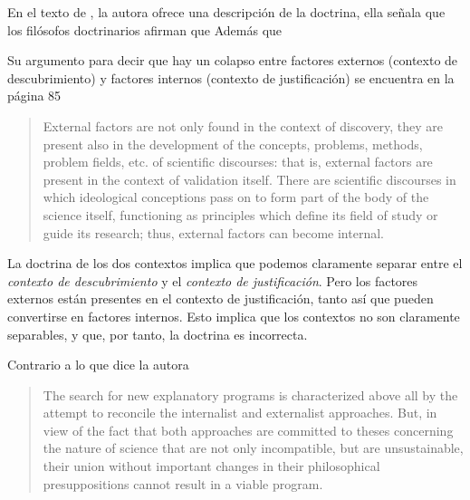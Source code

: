 \noindent En el texto de \textcite[][p.75]{Yturbe1995}, la autora ofrece una descripción de la doctrina, ella señala que los filósofos doctrinarios afirman que 
Además que 


Su argumento para decir que hay un colapso entre factores externos (contexto de descubrimiento) y factores internos (contexto de justificación) se encuentra en la página 85

\begin{quote}

	External factors are not only found in the context of discovery, they are present also in the development of the concepts, problems, methods, problem fields, etc. of scientific discourses: that is, external factors are present in the context of validation itself.
	There are scientific discourses in which ideological conceptions pass on to form part of the body of the science itself, functioning as principles which define its field of study or guide its research; thus, external factors can become internal.

\end{quote}

La doctrina de los dos contextos implica que podemos claramente separar entre el \emph{contexto de descubrimiento} y el \emph{contexto de justificación}.
Pero los factores externos están presentes en el contexto de justificación, tanto así que pueden convertirse en factores internos.
Esto implica que los contextos no son claramente separables, y que, por tanto, la doctrina es incorrecta.

Contrario a lo que dice la autora

\begin{quote}
	The search for new explanatory programs is characterized above all by the attempt to reconcile the internalist and externalist approaches. But, in view of the fact that both approaches are committed to theses concerning the nature of science that are not only incompatible, but are unsustainable, their union without important changes in their philosophical presuppositions cannot result in a viable program. \parencite[][p. 79]{Yturbe1995}
\end{quote}

